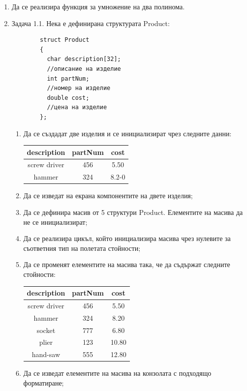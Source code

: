 {\begin{enumerate}
  \emph{И двете функции да се тестват с подходящи примери!}
  \item Да се реализира функция  за умножение на два полинома.

  \item Задача 1.1. \cite{sbornik2}  \label{zad:structproduct} Нека е дефинирана структурата Product:
	\begin{verbatim}
		struct Product
		{
		  char description[32];
		  //описание на изделие
		  int partNum;
		  //номер на изделие
		  double cost;
		  //цена на изделие
		};

	\end{verbatim}

	\begin{enumerate}[label=\alph*)]%
		\item Да се създадат две изделия и се инициализират чрез следните данни:

		\begin{tabular}{c | c | c}
			description & partNum & cost \\\hline
			screw driver & 456 & 5.50 \\\hline
			hammer & 324 & 8.2-0
		\end{tabular}

		\item Да се изведат на екрана компонентите на двете изделия;
		\item Да се дефинира масив от 5 структури Product. Елементите на масива да не се инициализират;
		\item Да се реализира цикъл, който инициализира масива чрез нулевите за съответния тип на полетата стойности;
		\item Да се променят елементите на масива така, че да съдържат следните стойности:

		\begin{tabular}{c | c | c}
			description & partNum & cost \\\hline
			screw driver & 456 & 5.50 \\\hline
			hammer & 324 & 8.20 \\\hline
			socket & 777 & 6.80 \\\hline
			plier & 123 & 10.80 \\\hline
			hand-saw & 555 & 12.80
		\end{tabular}
		\item Да се изведат елементите на масива на конзолата с подходящо форматиране;


\end{enumerate}
\end{enumerate}}

